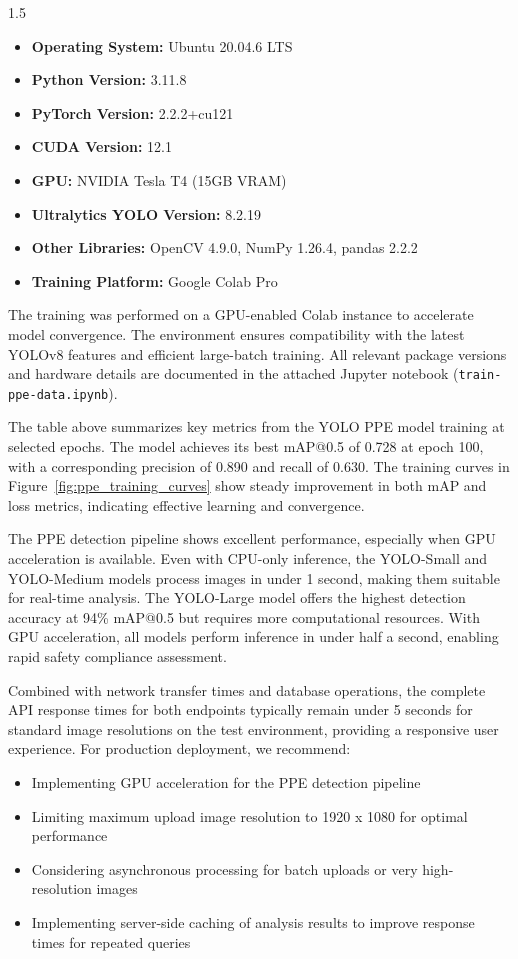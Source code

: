 \documentclass[12pt,a4paper]{report}
\begin{document}
\begin{spacing}{1.5}
    \begin{itemize}
        \item \textbf{Operating System:} Ubuntu 20.04.6 LTS
        \item \textbf{Python Version:} 3.11.8
        \item \textbf{PyTorch Version:} 2.2.2+cu121
        \item \textbf{CUDA Version:} 12.1
        \item \textbf{GPU:} NVIDIA Tesla T4 (15GB VRAM)
        \item \textbf{Ultralytics YOLO Version:} 8.2.19
        \item \textbf{Other Libraries:} OpenCV 4.9.0, NumPy 1.26.4, pandas 2.2.2
        \item \textbf{Training Platform:} Google Colab Pro
    \end{itemize}

    The training was performed on a GPU-enabled Colab instance to accelerate model convergence. The environment ensures compatibility with the latest YOLOv8 features and efficient large-batch training. All relevant package versions and hardware details are documented in the attached Jupyter notebook (\texttt{train-ppe-data.ipynb}).

    The table above summarizes key metrics from the YOLO PPE model training at selected epochs. The model achieves its best mAP@0.5 of 0.728 at epoch 100, with a corresponding precision of 0.890 and recall of 0.630. The training curves in Figure~\ref{fig:ppe_training_curves} show steady improvement in both mAP and loss metrics, indicating effective learning and convergence.

    The PPE detection pipeline shows excellent performance, especially when GPU acceleration is available. Even with CPU-only inference, the YOLO-Small and YOLO-Medium models process images in under 1 second, making them suitable for real-time analysis. The YOLO-Large model offers the highest detection accuracy at 94\% mAP@0.5 but requires more computational resources. With GPU acceleration, all models perform inference in under half a second, enabling rapid safety compliance assessment.

    Combined with network transfer times and database operations, the complete API response times for both endpoints typically remain under 5 seconds for standard image resolutions on the test environment, providing a responsive user experience. For production deployment, we recommend:


    \begin{itemize}
        \item Implementing GPU acceleration for the PPE detection pipeline
        \item Limiting maximum upload image resolution to 1920 x 1080 for optimal performance
        \item Considering asynchronous processing for batch uploads or very high-resolution images
        \item Implementing server-side caching of analysis results to improve response times for repeated queries
    \end{itemize}



\end{spacing}
\end{document}
